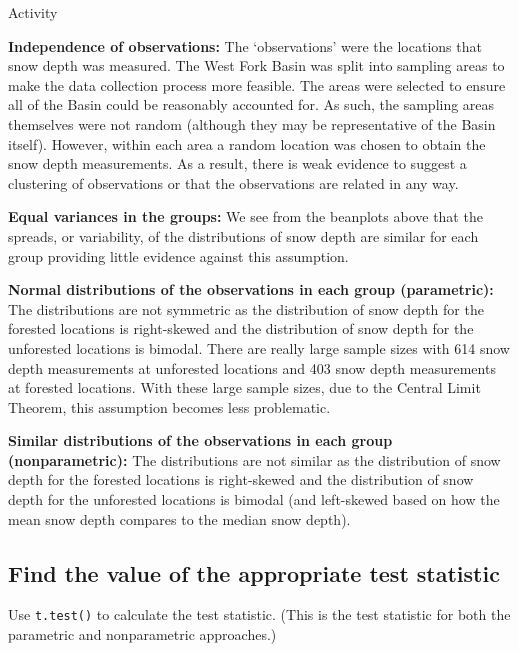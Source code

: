 \documentclass[12pt]{article}\usepackage[]{graphicx}\usepackage[]{color}
\begin{document}
\begin{exam}{Activity}
\begin{problem}
{\bf Independence of observations:} The `observations' were the locations that snow depth was measured. The West Fork Basin was split into sampling areas to make the data collection process more feasible. The areas were selected to ensure all of the Basin could be reasonably accounted for. As such, the sampling areas themselves were not random (although they may be representative of the Basin itself). However, within each area a random location was chosen to obtain the snow depth measurements. As a result, there is weak evidence to suggest a clustering of observations or that the observations are related in any way.
\end{problem}
\begin{problem}
{\bf Equal variances in the groups:} We see from the beanplots above that the spreads, or variability, of the distributions of snow depth are similar for each group providing little evidence against this assumption.
\end{problem}
\begin{problem*}
  \begin{parts}
  \item {\bf Normal distributions of the observations in each group (parametric):} The distributions are not symmetric as the distribution of snow depth for the forested locations is right-skewed and the distribution of snow depth for the unforested locations is bimodal. There are really large sample sizes with 614 snow depth measurements at unforested locations and 403 snow depth measurements at forested locations. With these large sample sizes, due to the Central Limit Theorem, this assumption becomes less problematic.
  \item {\bf Similar distributions of the observations in each group (nonparametric):} The distributions are not similar as the distribution of snow depth for the forested locations is right-skewed and the distribution of snow depth for the unforested locations is bimodal (and left-skewed based on how the mean snow depth compares to the median snow depth).
  \end{parts}
\end{problem*} 


\subsection*{Find the value of the appropriate test statistic}

\begin{problem*}
Use {\tt t.test()} to calculate the test statistic. (This is the test statistic for both the parametric and nonparametric approaches.)


\end{problem*}
\end{exam}
\end{document}
